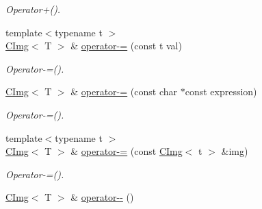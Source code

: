\begin{DoxyCompactItemize}
\begin{DoxyCompactList}\small\item\em Operator+(). \item\end{DoxyCompactList}\item 
\hypertarget{structcimg__library_1_1CImg_af18d9bcb5010cdea4c3f6496dd36ccb4}{
{\footnotesize template$<$typename t $>$ }\\\hyperlink{structcimg__library_1_1CImg}{CImg}$<$ T $>$ \& \hyperlink{structcimg__library_1_1CImg_af18d9bcb5010cdea4c3f6496dd36ccb4}{operator-\/=} (const t val)}
\label{structcimg__library_1_1CImg_af18d9bcb5010cdea4c3f6496dd36ccb4}

\begin{DoxyCompactList}\small\item\em Operator-\/=(). \item\end{DoxyCompactList}\item 
\hypertarget{structcimg__library_1_1CImg_a38817134bfaf56b78b41faae40365adf}{
\hyperlink{structcimg__library_1_1CImg}{CImg}$<$ T $>$ \& \hyperlink{structcimg__library_1_1CImg_a38817134bfaf56b78b41faae40365adf}{operator-\/=} (const char $\ast$const expression)}
\label{structcimg__library_1_1CImg_a38817134bfaf56b78b41faae40365adf}

\begin{DoxyCompactList}\small\item\em Operator-\/=(). \item\end{DoxyCompactList}\item 
\hypertarget{structcimg__library_1_1CImg_aff89b226a15e536f2d23b590ed9ba4de}{
{\footnotesize template$<$typename t $>$ }\\\hyperlink{structcimg__library_1_1CImg}{CImg}$<$ T $>$ \& \hyperlink{structcimg__library_1_1CImg_aff89b226a15e536f2d23b590ed9ba4de}{operator-\/=} (const \hyperlink{structcimg__library_1_1CImg}{CImg}$<$ t $>$ \&img)}
\label{structcimg__library_1_1CImg_aff89b226a15e536f2d23b590ed9ba4de}

\begin{DoxyCompactList}\small\item\em Operator-\/=(). \item\end{DoxyCompactList}\item 
\hypertarget{structcimg__library_1_1CImg_a8d71ada97bd3d54d3f4265f0059273cf}{
\hyperlink{structcimg__library_1_1CImg}{CImg}$<$ T $>$ \& \hyperlink{structcimg__library_1_1CImg_a8d71ada97bd3d54d3f4265f0059273cf}{operator-\/-\/} ()}
\label{structcimg__library_1_1CImg_a8d71ada97bd3d54d3f4265f0059273cf}


\end{DoxyCompactItemize}
